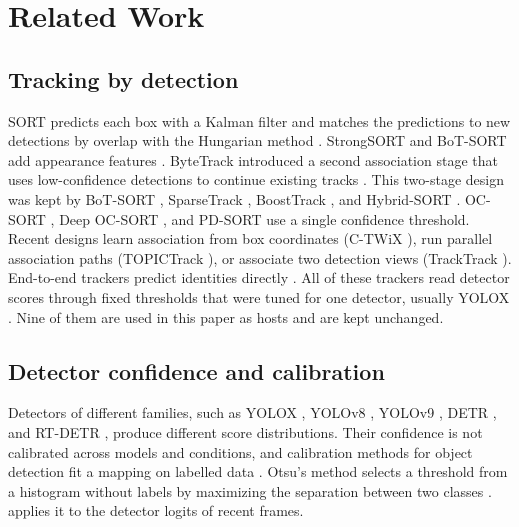 \section{Related Work}\label{sec:related}

\subsection{Tracking by detection}
SORT predicts each box with a Kalman filter and matches the predictions to new
detections by overlap with the Hungarian method \cite{bewley2016sort}.
StrongSORT and BoT-SORT add appearance features
\cite{du2023strongsort,aharon2022botsort}. ByteTrack
introduced a second association stage that uses low-confidence detections to
continue existing tracks \cite{zhang2022bytetrack}. This two-stage design was
kept by BoT-SORT \cite{aharon2022botsort}, SparseTrack \cite{liu2025sparsetrack},
BoostTrack \cite{stanojevic2024boosttrack}, and Hybrid-SORT
\cite{yang2024hybridsort}. OC-SORT \cite{cao2023ocsort}, Deep OC-SORT
\cite{maggiolino2023deepocsort}, and PD-SORT \cite{wang2025pdsort} use a single
confidence threshold. Recent designs learn association from box coordinates
(C-TWiX \cite{miah2025twix}), run parallel association paths (TOPICTrack
\cite{cao2025topictrack}), or associate two detection views (TrackTrack
\cite{shim2025tracktrack}). End-to-end trackers predict identities directly
\cite{zeng2022motr,gao2025motip}. All of these trackers read detector scores
through fixed thresholds that were tuned for one detector, usually YOLOX
\cite{ge2021yolox}. Nine of them are used in this paper as hosts and are kept
unchanged.

\subsection{Detector confidence and calibration}
Detectors of different families, such as YOLOX \cite{ge2021yolox}, YOLOv8
\cite{jocher2023yolov8}, YOLOv9 \cite{wang2024yolov9}, DETR
\cite{carion2020detr}, and RT-DETR
\cite{zhao2024rtdetr}, produce different score distributions. Their confidence
is not calibrated across models and conditions, and calibration methods for
object detection fit a mapping on labelled data \cite{kuppers2020detcalib}.
Otsu's method selects a threshold from a histogram without labels by
maximizing the separation between two classes \cite{otsu1979}. \scl{}
applies it to the detector logits of recent frames.

